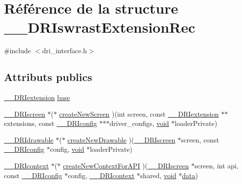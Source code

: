 \hypertarget{struct_____d_r_iswrast_extension_rec}{\section{Référence de la structure \-\_\-\-\_\-\-D\-R\-Iswrast\-Extension\-Rec}
\label{struct_____d_r_iswrast_extension_rec}
}


{\ttfamily \#include $<$dri\-\_\-interface.\-h$>$}

\subsection*{Attributs publics}
\begin{DoxyCompactItemize}
\item 
\hyperlink{dri__interface_8h_a4e0a61c8ece00d2b2c6792a9a1b55385}{\-\_\-\-\_\-\-D\-R\-Iextension} \hyperlink{struct_____d_r_iswrast_extension_rec_abf612ae76eaa8762ec951509c3e38cad}{base}
\item 
\hyperlink{dri__interface_8h_a9961b01d421ee1fd6ed3c05acc9ca561}{\-\_\-\-\_\-\-D\-R\-Iscreen} $\ast$($\ast$ \hyperlink{struct_____d_r_iswrast_extension_rec_a3c32551d1ae7d0b952dbc54e6938617b}{create\-New\-Screen} )(int screen, const \hyperlink{dri__interface_8h_a4e0a61c8ece00d2b2c6792a9a1b55385}{\-\_\-\-\_\-\-D\-R\-Iextension} $\ast$$\ast$extensions, const \hyperlink{dri__interface_8h_aeac81999efbbf8b1d6886338e3ea24d9}{\-\_\-\-\_\-\-D\-R\-Iconfig} $\ast$$\ast$$\ast$driver\-\_\-configs, \hyperlink{glu_8h_a4292190e3f1f6b373a760c7d9316ad3c}{void} $\ast$loader\-Private)
\item 
\hyperlink{dri__interface_8h_a5bfb832a0a08208d95b3bbef439d2262}{\-\_\-\-\_\-\-D\-R\-Idrawable} $\ast$($\ast$ \hyperlink{struct_____d_r_iswrast_extension_rec_a0cb888f1b3abf57975a8b5f417a3a7fc}{create\-New\-Drawable} )(\hyperlink{dri__interface_8h_a9961b01d421ee1fd6ed3c05acc9ca561}{\-\_\-\-\_\-\-D\-R\-Iscreen} $\ast$screen, const \hyperlink{dri__interface_8h_aeac81999efbbf8b1d6886338e3ea24d9}{\-\_\-\-\_\-\-D\-R\-Iconfig} $\ast$config, \hyperlink{glu_8h_a4292190e3f1f6b373a760c7d9316ad3c}{void} $\ast$loader\-Private)
\item 
\hyperlink{dri__interface_8h_a3fd295cba82b5a3d79f1ee7e12bfb908}{\-\_\-\-\_\-\-D\-R\-Icontext} $\ast$($\ast$ \hyperlink{struct_____d_r_iswrast_extension_rec_a0379a865132590d3b9d83896c0cc7e00}{create\-New\-Context\-For\-A\-P\-I} )(\hyperlink{dri__interface_8h_a9961b01d421ee1fd6ed3c05acc9ca561}{\-\_\-\-\_\-\-D\-R\-Iscreen} $\ast$screen, int api, const \hyperlink{dri__interface_8h_aeac81999efbbf8b1d6886338e3ea24d9}{\-\_\-\-\_\-\-D\-R\-Iconfig} $\ast$config, \hyperlink{dri__interface_8h_a3fd295cba82b5a3d79f1ee7e12bfb908}{\-\_\-\-\_\-\-D\-R\-Icontext} $\ast$shared, \hyperlink{glu_8h_a4292190e3f1f6b373a760c7d9316ad3c}{void} $\ast$\hyperlink{gl_8h_ae71d2e007af6a1d1ed622d3e8be266e2}{data})
$$
\end{DoxyCompactItemize}
